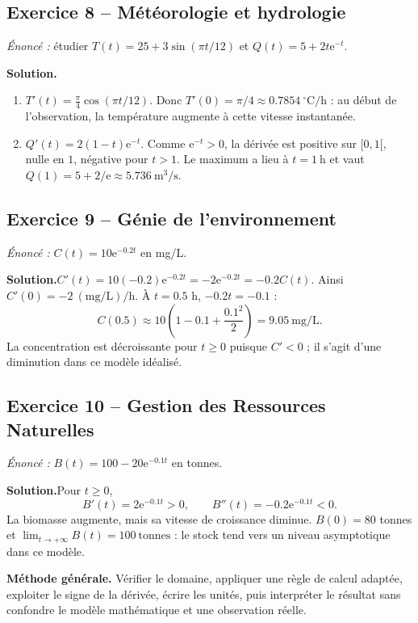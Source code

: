 \documentclass[11pt,a4paper,oneside]{article}
\newcommand{\e}{\mathrm e}
\newcommand{\solution}{\textbf{\color{Sarcelle}Solution.}\enspace}
\begin{document}
\subsection*{Exercice 8 -- Météorologie et hydrologie}
\textit{Énoncé :} étudier $T(t)=25+3\sin(\pi t/12)$ et $Q(t)=5+2t\e^{-t}$.

\solution
\begin{enumerate}[label=\alph*)]
\item $T'(t)=\frac\pi4\cos(\pi t/12)$. Donc $\boxed{T'(0)=\pi/4\approx0.7854\ ^\circ\mathrm C/\mathrm h}$ : au début de l'observation, la température augmente à cette vitesse instantanée.
\item $Q'(t)=2(1-t)\e^{-t}$. Comme $\e^{-t}>0$, la dérivée est positive sur $[0,1[$, nulle en $1$, négative pour $t>1$. Le maximum a lieu à $\boxed{t=1\ \mathrm h}$ et vaut $\boxed{Q(1)=5+2/\e\approx5.736\ \mathrm{m^3/s}}$.
\end{enumerate}

\subsection*{Exercice 9 -- Génie de l'environnement}
\textit{Énoncé :} $C(t)=10\e^{-0.2t}$ en mg/L.

\solution $C'(t)=10(-0.2)\e^{-0.2t}=\boxed{-2\e^{-0.2t}=-0.2C(t)}$. Ainsi $C'(0)=-2\ \mathrm{(mg/L)/h}$. À $t=0.5$ h, $-0.2t=-0.1$ :
\[C(0.5)\approx10\left(1-0.1+\frac{0.1^2}{2}\right)=\boxed{9.05\ \mathrm{mg/L}}.\]
La concentration est décroissante pour $t\ge0$ puisque $C'<0$ ; il s'agit d'une diminution dans ce modèle idéalisé.

\subsection*{Exercice 10 -- Gestion des Ressources Naturelles}
\textit{Énoncé :} $B(t)=100-20\e^{-0.1t}$ en tonnes.

\solution Pour $t\ge0$,
\[\boxed{B'(t)=2\e^{-0.1t}>0},\qquad
\boxed{B''(t)=-0.2\e^{-0.1t}<0}.\]
La biomasse augmente, mais sa vitesse de croissance diminue. $B(0)=80$ tonnes et $\lim_{t\to+\infty}B(t)=\boxed{100\ \mathrm{tonnes}}$ : le stock tend vers un niveau asymptotique dans ce modèle.

\begin{objectifbox}
\textbf{Méthode générale.} Vérifier le domaine, appliquer une règle de calcul adaptée, exploiter le signe de la dérivée, écrire les unités, puis interpréter le résultat sans confondre le modèle mathématique et une observation réelle.
\end{objectifbox}
\end{document}
